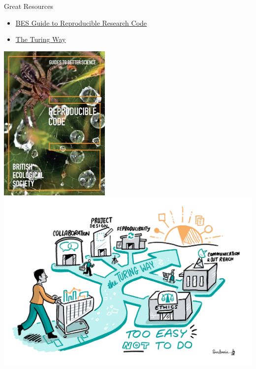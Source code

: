 \documentclass{beamer} %
\begin{document}
  \begin{frame}{Great Resources}
    \begin{itemize}
      \item \href{https://www.britishecologicalsociety.org/wp-content/uploads/2017/12/guide-to-reproducible-code.pdf}{\underline{BES Guide to Reproducible Research Code}}
      \item \href{https://the-turing-way.netlify.app/}{\underline{The Turing Way}}
    \end{itemize}
    \begin{center}
      \includegraphics[height=0.4\textheight]{bes_reproducible_code.jpg}
      \hspace{1cm}
      \includegraphics[height=0.4\textheight]{turing_way.jpg}
    \end{center}
  \end{frame}
\end{document}
